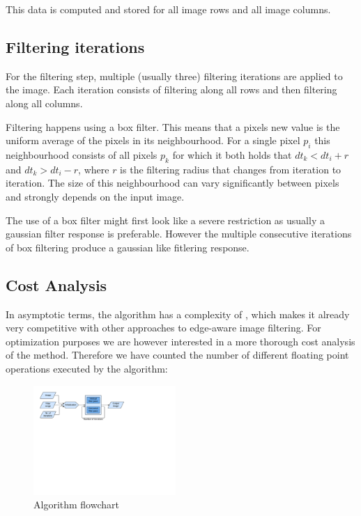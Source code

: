 This data is computed and stored for all image rows and all image columns.

\subsection{Filtering iterations}

For the filtering step, multiple (usually three) filtering iterations are applied to the image. Each iteration consists of filtering along all rows and then filtering along all columns.

Filtering happens using a box filter. This means that a pixels new value is the uniform average of the pixels in its neighbourhood. For a single pixel $p_i$ this neighbourhood consists of all pixels $p_k$ for which it both holds that $dt_k < dt_i+r$ and $dt_k > dt_i-r$, where $r$ is the filtering radius that changes from iteration to iteration. The size of this neighbourhood can vary significantly between pixels and strongly depends on the input image.

The use of a box filter might first look like a severe restriction as usually a gaussian filter response is preferable. However the multiple consecutive iterations of box filtering produce a gaussian like fitlering response.

\subsection{Cost Analysis}
In asymptotic terms, the algorithm has a complexity of , which makes it already very competitive with other approaches to edge-aware image filtering. For optimization purposes we are however interested in a more thorough cost analysis of the method. Therefore we have counted the number of different floating point operations executed by the algorithm:


\setlength\fboxsep{0pt}
\setlength\fboxrule{0.5pt}

\begin{figure}\vspace{-1mm}
  \includegraphics[trim=10mm 145mm 100mm 10mm, clip, width=0.48\textwidth]{figures/flowchart.pdf}
  \caption{Algorithm flowchart\label{flowchart}}
\end{figure}

